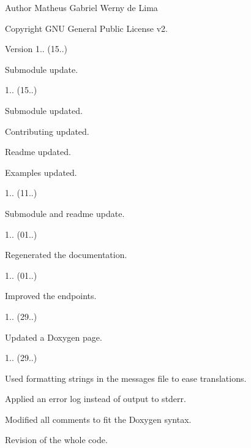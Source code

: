\begin{DoxyAuthor}{Author}
Matheus Gabriel Werny de Lima 
\end{DoxyAuthor}
\begin{DoxyCopyright}{Copyright}
G\+NU General Public License v2. 
\end{DoxyCopyright}
\begin{DoxyVersion}{Version}
1.. (15..)
\begin{DoxyItemize}
\item Submodule update. 
\end{DoxyItemize}

1.. (15..)
\begin{DoxyItemize}
\item Submodule updated.
\item Contributing updated.
\item Readme updated.
\item Examples updated. 
\end{DoxyItemize}

1.. (11..)
\begin{DoxyItemize}
\item Submodule and readme update. 
\end{DoxyItemize}

1.. (01..)
\begin{DoxyItemize}
\item Regenerated the documentation. 
\end{DoxyItemize}

1.. (01..)
\begin{DoxyItemize}
\item Improved the endpoints. 
\end{DoxyItemize}

1.. (29..)
\begin{DoxyItemize}
\item Updated a Doxygen page. 
\end{DoxyItemize}

1.. (29..)
\begin{DoxyItemize}
\item Used formatting strings in the messages file to ease translations.
\item Applied an error log instead of output to stderr.
\item Modified all comments to fit the Doxygen syntax.
\item Revision of the whole code. 
\end{DoxyItemize}
\end{DoxyVersion}

